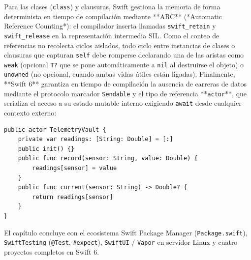 \documentclass{book}
\begin{document}
Para las clases (\texttt{class}) y clausuras, Swift gestiona la memoria de forma determinista en tiempo de compilación mediante **ARC** (*Automatic Reference Counting*): el compilador inserta llamadas \texttt{swift\_retain} y \texttt{swift\_release} en la representación intermedia SIL. Como el conteo de referencias no recolecta ciclos aislados, todo ciclo entre instancias de clases o clausuras que capturan \texttt{self} debe romperse declarando una de las aristas como \texttt{weak} (opcional \texttt{T?} que se pone automáticamente a \texttt{nil} al destruirse el objeto) o \texttt{unowned} (no opcional, cuando ambas vidas útiles están ligadas). Finalmente, **Swift 6** garantiza en tiempo de compilación la ausencia de carreras de datos mediante el protocolo marcador \texttt{Sendable} y el tipo de referencia **\texttt{actor}**, que serializa el acceso a su estado mutable interno exigiendo \texttt{await} desde cualquier contexto externo:
\begin{lstlisting}[style=studium]
public actor TelemetryVault {
    private var readings: [String: Double] = [:]
    public init() {}
    public func record(sensor: String, value: Double) {
        readings[sensor] = value
    }
    public func current(sensor: String) -> Double? {
        return readings[sensor]
    }
}
\end{lstlisting}
El capítulo concluye con el ecosistema Swift Package Manager (\texttt{Package.swift}), \texttt{SwiftTesting} (\texttt{@Test}, \texttt{\#expect}), \texttt{SwiftUI} / \texttt{Vapor} en servidor Linux y cuatro proyectos completos en Swift 6.
\end{document}
